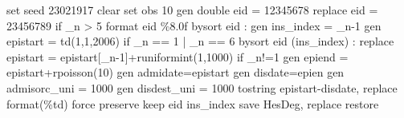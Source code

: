 set seed 23021917
clear
set obs 10
gen double eid = 12345678
replace eid = 23456789 if _n > 5
format eid \%8.0f
bysort eid : gen ins_index = _n-1
gen epistart = td(1,1,2006) if _n == 1 | _n == 6
bysort eid (ins_index) : replace epistart = epistart[_n-1]+runiformint(1,1000) if _n!=1
gen epiend = epistart+rpoisson(10)
gen admidate=epistart
gen disdate=epien
gen admisorc_uni = 1000
gen disdest_uni = 1000
tostring epistart-disdate, replace format(\%td) force
preserve
keep eid ins_index
save HesDeg, replace
restore
